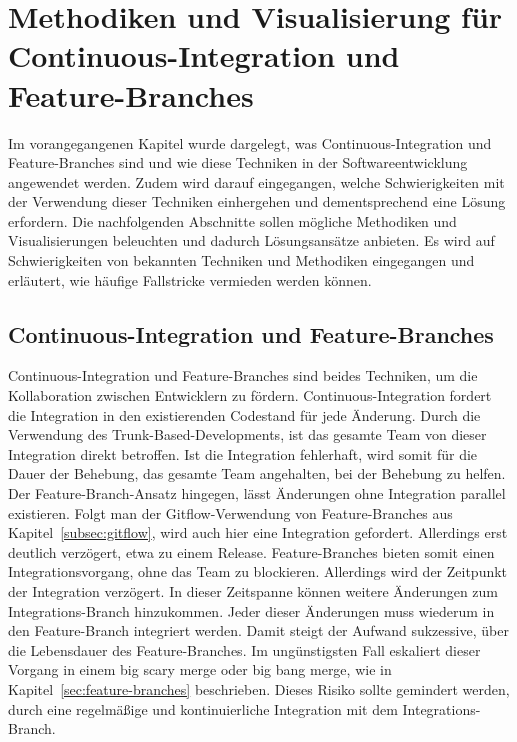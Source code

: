 \chapter[Methodiken und Visualisierung]{Methodiken und Visualisierung für Continuous-Integration und Feature-Branches}
\label{ch:visu_meth}

Im vorangegangenen Kapitel wurde dargelegt, was Continuous-Integration und Feature-Branches sind und wie diese Techniken in der Softwareentwicklung angewendet werden. Zudem wird darauf eingegangen, welche Schwierigkeiten mit der Verwendung dieser Techniken einhergehen und dementsprechend eine Lösung erfordern. 
Die nachfolgenden Abschnitte sollen mögliche Methodiken und Visualisierungen beleuchten und dadurch Lösungsansätze anbieten. Es wird auf Schwierigkeiten von bekannten Techniken und Methodiken eingegangen und erläutert, wie häufige Fallstricke vermieden werden können.

\section{Continuous-Integration und Feature-Branches}

Continuous-Integration und Feature-Branches sind beides Techniken, um die Kollaboration zwischen Entwicklern zu fördern. Continuous-Integration fordert die Integration in den existierenden Codestand für jede Änderung. Durch die Verwendung des Trunk-Based-Developments, ist das gesamte Team von dieser Integration direkt betroffen. Ist die Integration fehlerhaft, wird somit für die Dauer der Behebung, das gesamte Team angehalten, bei der Behebung zu helfen. Der Feature-Branch-Ansatz hingegen, lässt Änderungen ohne Integration parallel existieren. Folgt man der Gitflow-Verwendung von Feature-Branches aus Kapitel~\ref{subsec:gitflow}, wird auch hier eine Integration gefordert. Allerdings erst deutlich verzögert, etwa zu einem Release. Feature-Branches bieten somit einen Integrationsvorgang, ohne das Team zu blockieren. Allerdings wird der Zeitpunkt der Integration verzögert. In dieser Zeitspanne können weitere Änderungen zum Integrations-Branch hinzukommen. Jeder dieser Änderungen muss wiederum in den Feature-Branch integriert werden. Damit steigt der Aufwand sukzessive, über die Lebensdauer des Feature-Branches. Im ungünstigsten Fall eskaliert dieser Vorgang in einem \glqq big scary merge\grqq{} oder \glqq big bang merge\grqq{}, wie in Kapitel~\ref{sec:feature-branches} beschrieben. Dieses Risiko sollte gemindert werden, durch eine regelmäßige und kontinuierliche Integration mit dem Integrations-Branch.\\

